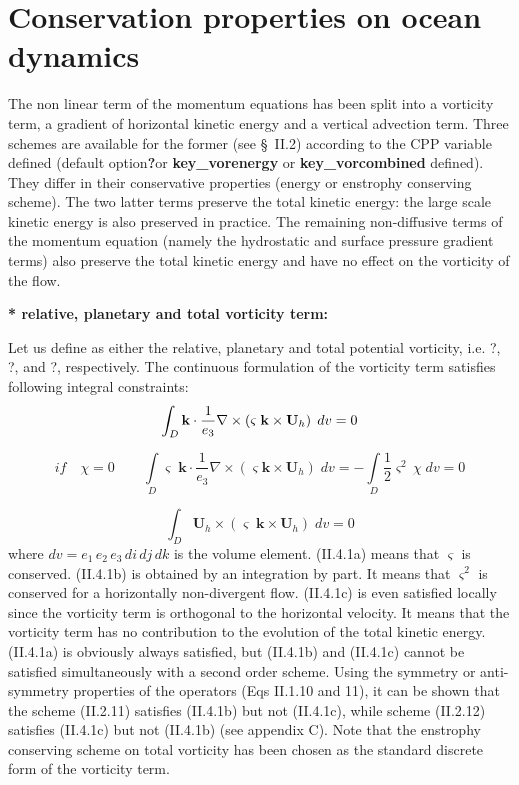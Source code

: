 \documentclass[../main/NEMO_manual]{subfiles}
\begin{document}
\section{Conservation properties on ocean dynamics}
\label{sec:Invariant_dyn}

The non linear term of the momentum equations has been split into a vorticity term,
a gradient of horizontal kinetic energy and a vertical advection term.
Three schemes are available for the former (see {\S}~II.2) according to the CPP variable defined
(default option\textbf{?}or \textbf{key{\_}vorenergy} or \textbf{key{\_}vorcombined} defined).
They differ in their conservative properties (energy or enstrophy conserving scheme).
The two latter terms preserve the total kinetic energy:
the large scale kinetic energy is also preserved in practice.
The remaining non-diffusive terms of the momentum equation
(namely the hydrostatic and surface pressure gradient terms) also preserve the total kinetic energy and
have no effect on the vorticity of the flow.

\textbf{* relative, planetary and total vorticity term:}

Let us define as either the relative, planetary and total potential vorticity, i.e. ?, ?, and ?, respectively.
The continuous formulation of the vorticity term satisfies following integral constraints:
\[
  \int_D {{\textbf {k}}\cdot \frac{1}{e_3 }\nabla \times \left( {\varsigma
        \;{\rm {\bf k}}\times {\textbf {U}}_h } \right)\;dv} =0
\]

\[
  if\quad \chi =0\quad \quad \int\limits_D {\varsigma \;{\textbf{k}}\cdot
    \frac{1}{e_3 }\nabla \times \left( {\varsigma {\textbf{k}}\times {\textbf{U}}_h } \right)\;dv} =-\int\limits_D {\frac{1}{2}\varsigma ^2\,\chi \;dv}
  =0
\]

\[
  \int_D {{\textbf{U}}_h \times \left( {\varsigma \;{\textbf{k}}\times {\textbf{U}}_h } \right)\;dv} =0
\]
where $dv = e_1\, e_2\, e_3\, di\, dj\, dk$ is the volume element.
(II.4.1a) means that $\varsigma $ is conserved. (II.4.1b) is obtained by an integration by part.
It means that $\varsigma^2$ is conserved for a horizontally non-divergent flow.
(II.4.1c) is even satisfied locally since the vorticity term is orthogonal to the horizontal velocity.
It means that the vorticity term has no contribution to the evolution of the total kinetic energy.
(II.4.1a) is obviously always satisfied, but (II.4.1b) and (II.4.1c) cannot be satisfied simultaneously with
a second order scheme.
Using the symmetry or anti-symmetry properties of the operators (Eqs II.1.10 and 11),
it can be shown that the scheme (II.2.11) satisfies (II.4.1b) but not (II.4.1c),
while scheme (II.2.12) satisfies (II.4.1c) but not (II.4.1b) (see appendix C). 
Note that the enstrophy conserving scheme on total vorticity has been chosen as the standard discrete form of
the vorticity term.
\end{document}
